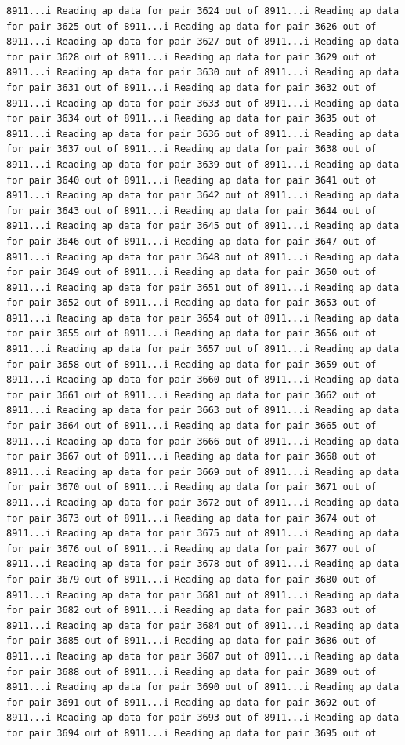 \documentclass[
]{article}
\begin{document}
\begin{verbatim}
8911...i Reading ap data for pair 3624 out of 8911...i Reading ap data for pair 3625 out of 8911...i Reading ap data for pair 3626 out of 8911...i Reading ap data for pair 3627 out of 8911...i Reading ap data for pair 3628 out of 8911...i Reading ap data for pair 3629 out of 8911...i Reading ap data for pair 3630 out of 8911...i Reading ap data for pair 3631 out of 8911...i Reading ap data for pair 3632 out of 8911...i Reading ap data for pair 3633 out of 8911...i Reading ap data for pair 3634 out of 8911...i Reading ap data for pair 3635 out of 8911...i Reading ap data for pair 3636 out of 8911...i Reading ap data for pair 3637 out of 8911...i Reading ap data for pair 3638 out of 8911...i Reading ap data for pair 3639 out of 8911...i Reading ap data for pair 3640 out of 8911...i Reading ap data for pair 3641 out of 8911...i Reading ap data for pair 3642 out of 8911...i Reading ap data for pair 3643 out of 8911...i Reading ap data for pair 3644 out of 8911...i Reading ap data for pair 3645 out of 8911...i Reading ap data for pair 3646 out of 8911...i Reading ap data for pair 3647 out of 8911...i Reading ap data for pair 3648 out of 8911...i Reading ap data for pair 3649 out of 8911...i Reading ap data for pair 3650 out of 8911...i Reading ap data for pair 3651 out of 8911...i Reading ap data for pair 3652 out of 8911...i Reading ap data for pair 3653 out of 8911...i Reading ap data for pair 3654 out of 8911...i Reading ap data for pair 3655 out of 8911...i Reading ap data for pair 3656 out of 8911...i Reading ap data for pair 3657 out of 8911...i Reading ap data for pair 3658 out of 8911...i Reading ap data for pair 3659 out of 8911...i Reading ap data for pair 3660 out of 8911...i Reading ap data for pair 3661 out of 8911...i Reading ap data for pair 3662 out of 8911...i Reading ap data for pair 3663 out of 8911...i Reading ap data for pair 3664 out of 8911...i Reading ap data for pair 3665 out of 8911...i Reading ap data for pair 3666 out of 8911...i Reading ap data for pair 3667 out of 8911...i Reading ap data for pair 3668 out of 8911...i Reading ap data for pair 3669 out of 8911...i Reading ap data for pair 3670 out of 8911...i Reading ap data for pair 3671 out of 8911...i Reading ap data for pair 3672 out of 8911...i Reading ap data for pair 3673 out of 8911...i Reading ap data for pair 3674 out of 8911...i Reading ap data for pair 3675 out of 8911...i Reading ap data for pair 3676 out of 8911...i Reading ap data for pair 3677 out of 8911...i Reading ap data for pair 3678 out of 8911...i Reading ap data for pair 3679 out of 8911...i Reading ap data for pair 3680 out of 8911...i Reading ap data for pair 3681 out of 8911...i Reading ap data for pair 3682 out of 8911...i Reading ap data for pair 3683 out of 8911...i Reading ap data for pair 3684 out of 8911...i Reading ap data for pair 3685 out of 8911...i Reading ap data for pair 3686 out of 8911...i Reading ap data for pair 3687 out of 8911...i Reading ap data for pair 3688 out of 8911...i Reading ap data for pair 3689 out of 8911...i Reading ap data for pair 3690 out of 8911...i Reading ap data for pair 3691 out of 8911...i Reading ap data for pair 3692 out of 8911...i Reading ap data for pair 3693 out of 8911...i Reading ap data for pair 3694 out of 8911...i Reading ap data for pair 3695 out of 
\end{verbatim}
\end{document}
